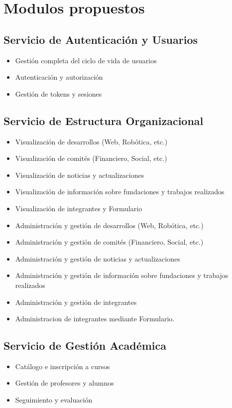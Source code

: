 \documentclass[11pt,a4paper]{article}
\begin{document}
\section{Modulos propuestos}

\subsection{Servicio de Autenticación y Usuarios}
\begin{itemize}
	\item Gestión completa del ciclo de vida de usuarios
	\item Autenticación y autorización
	\item Gestión de tokens y sesiones
\end{itemize}

\subsection{Servicio de Estructura Organizacional}
\begin{itemize}
	\item Visualización de desarrollos (Web, Robótica, etc.)
	\item Visualización de comités (Financiero, Social, etc.)
	\item Visualización de noticias y actualizaciones
	\item Visualización de información sobre fundaciones y trabajos realizados
	\item Visualización de integrantes y Formulario

	\item Administración y gestión de desarrollos (Web, Robótica, etc.)
	\item Administración y gestión de comités (Financiero, Social, etc.)
	\item Administración y gestión de noticias y actualizaciones
	\item Administración y gestión de información sobre fundaciones y trabajos realizados
	\item Administración y gestión de integrantes
	\item Administracion de integrantes mediante Formulario.
\end{itemize}

\subsection{Servicio de Gestión Académica}
\begin{itemize}
	\item Catálogo e inscripción a cursos
	\item Gestión de profesores y alumnos
	\item Seguimiento y evaluación
\end{itemize}
\end{document}
